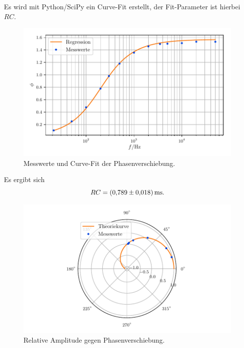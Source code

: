 Es wird mit Python/SciPy ein Curve-Fit erstellt, der Fit-Parameter ist hierbei $RC$.
\begin{figure}[H]
    \centering
    \includegraphics[width=\textwidth]{build/messung3.pdf}
    \caption{Messwerte und Curve-Fit der Phasenverschiebung.}
    \label{fig:plot3}
\end{figure}
\noindent
Es ergibt sich
\begin{equation}
    RC = \SI{0.789\pm0.018}{\milli\second}.
\end{equation}
\noindent
\begin{figure}[H]
    \centering
    \includegraphics[width=\textwidth]{build/polar.pdf}
    \caption{Relative Amplitude gegen Phasenverschiebung.}
    \label{fig:polar}
\end{figure}
%
